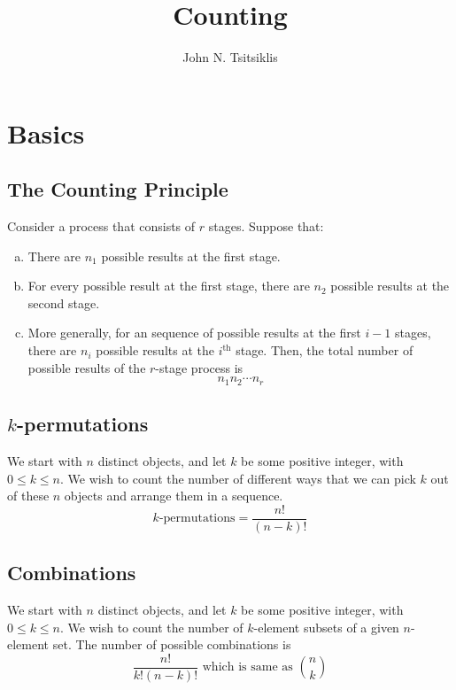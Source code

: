 \documentclass{tufte-handout}
\author{John N. Tsitsiklis}
\title{Counting}
\theoremstyle{definition} \newtheorem{definition}{Definition}
\theoremstyle{definition} \newtheorem{remark}{Remark}
\begin{document}
\maketitle
\section{Basics}

\subsection{The Counting Principle}
Consider a process that consists of $r$ stages. Suppose that:
\begin{enumerate}[(a)]
\item There are $n_1$ possible results at the first stage.
\item For every possible result at the first stage, there are $n_2$
  possible results at the second stage.

\item More generally, for an sequence of possible results at the first
  $i - 1$ stages, there are $n_i$ possible results at the $i^{\text{th}}$
  stage. Then, the total number of possible results of the $r$-stage
  process is
  \begin{equation*}
    n_1 n_2 \cdots n_r
  \end{equation*}
\end{enumerate}

\subsection{$k$-permutations}
We start with $n$ distinct objects, and let $k$ be some positive integer,
with $0 \leq k \leq n$. We wish to count the number of different ways
that we can pick $k$ out of these $n$ objects and arrange them in a
sequence.
\begin{equation*}
  k\text{-permutations} = \frac{n!}{(n-k)!}
\end{equation*}

\subsection{Combinations}
We start with $n$ distinct objects, and let $k$ be some positive integer,
with $0 \leq k \leq n$. We wish to count the number of $k$-element
subsets of a given $n$-element set. The number of possible combinations
is
\begin{equation*}
  \frac{n!}{k!(n-k)!} \text{ which is same as } \binom{n}{k}
\end{equation*}
\end{document}
